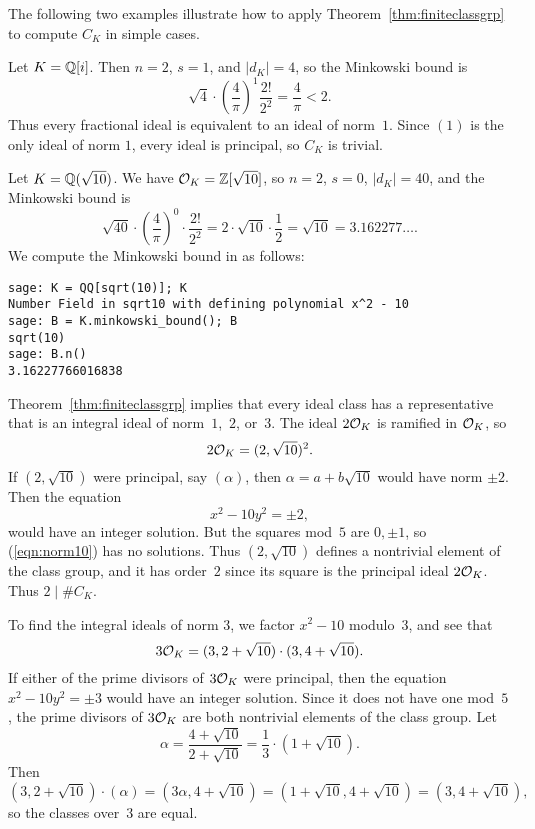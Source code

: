 The following two examples illustrate how to apply
Theorem~\ref{thm:finiteclassgrp} to compute $C_K$ in
simple cases. 
\begin{example}
Let $K=\mathbb{Q}[i]$.  Then $n=2$, $s=1$, and $|d_K|=4$, so the Minkowski bound is
$$
\sqrt{4} \cdot \left(\frac{4}{\pi}\right)^1 \frac{2!}{2^2}
  = \frac{4}{\pi} < 2.
$$
Thus every fractional ideal is equivalent to an ideal of norm~$1$.
Since $(1)$ is the only ideal of norm $1$, every ideal is principal,
so $C_K$ is trivial.
\end{example}

\begin{example}
Let $K=\mathbb{Q}(\sqrt{10})$. 
We have $\mathcal{O}_K = \mathbb{Z}[\sqrt{10}]$,
so $n=2$, $s=0$, $|d_K| = 40$, and the
Minkowski bound is
$$
  \sqrt{40}\cdot \left(\frac{4}{\pi}\right)^0 \cdot \frac{2!}{2^2}
  = 2\cdot \sqrt{10} \cdot \frac{1}{2} = \sqrt{10} = 3.162277\ldots.
$$
We compute the Minkowski bound in \sage as follows:
\begin{verbatim}
sage: K = QQ[sqrt(10)]; K
Number Field in sqrt10 with defining polynomial x^2 - 10
sage: B = K.minkowski_bound(); B
sqrt(10)
sage: B.n()
3.16227766016838
\end{verbatim}
Theorem~\ref{thm:finiteclassgrp} implies that every ideal class has a
representative that is an integral ideal of norm~$1$,~$2$, or~$3$.
The ideal $2\mathcal{O}_K$ is ramified in $\mathcal{O}_K$, so
$$
  2\mathcal{O}_K = (2,\sqrt{10})^2.
$$
If $(2,\sqrt{10})$ were principal, say $(\alpha)$, then 
$\alpha=a+b\sqrt{10}$ would have norm $\pm 2$. 
Then the equation
\begin{equation}\label{eqn:norm10}
  x^2 - 10y^2 = \pm 2,
\end{equation}
would have an integer solution.  But the squares mod~$5$ are 
$0,\pm 1$, so (\ref{eqn:norm10}) has no solutions. 
Thus $(2,\sqrt{10})$ defines a nontrivial element of the class group,
and it has order~$2$ since its square is the principal ideal $2\mathcal{O}_K$.
Thus $2\mid \#C_K$.

To find the integral ideals of norm $3$, we 
factor $x^2-10$ modulo~$3$, and see that
$$
  3\mathcal{O}_K  = (3,2+\sqrt{10}) \cdot (3,4+\sqrt{10}).
$$
If either of the prime divisors of $3\mathcal{O}_K$ were principal,
then the equation $x^2-10y^2 = \pm 3$ would have an integer
solution.  Since it does not have one mod~$5$, the prime divisors
of $3\mathcal{O}_K$ are both nontrivial elements of the class
group.
Let
$$
  \alpha = \frac{4+\sqrt{10}}{2+\sqrt{10}} = \frac{1}{3}\cdot (1+\sqrt{10}).
$$
Then
$$
(3,2+\sqrt{10})\cdot (\alpha) =  (3\alpha, 4+\sqrt{10})
                        =  (1+\sqrt{10}, 4+\sqrt{10})
                        =  (3, 4+\sqrt{10}),
$$
so the classes over~$3$ are equal.


\end{example}
